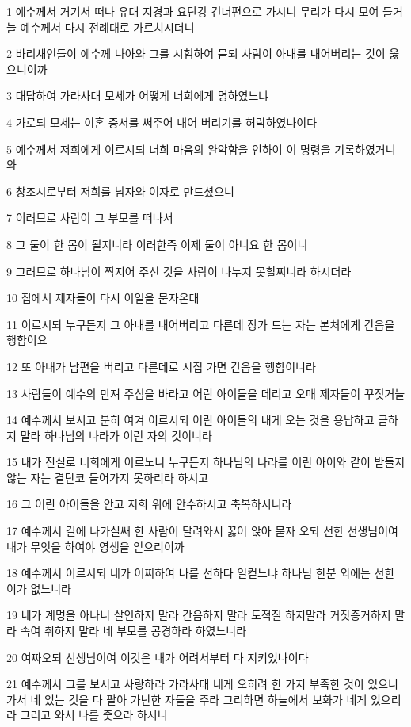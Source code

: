 \par 1 예수께서 거기서 떠나 유대 지경과 요단강 건너편으로 가시니 무리가 다시 모여 들거늘 예수께서 다시 전례대로 가르치시더니
\par 2 바리새인들이 예수께 나아와 그를 시험하여 묻되 사람이 아내를 내어버리는 것이 옳으니이까
\par 3 대답하여 가라사대 모세가 어떻게 너희에게 명하였느냐
\par 4 가로되 모세는 이혼 증서를 써주어 내어 버리기를 허락하였나이다
\par 5 예수께서 저희에게 이르시되 너희 마음의 완악함을 인하여 이 명령을 기록하였거니와
\par 6 창조시로부터 저희를 남자와 여자로 만드셨으니
\par 7 이러므로 사람이 그 부모를 떠나서
\par 8 그 둘이 한 몸이 될지니라 이러한즉 이제 둘이 아니요 한 몸이니
\par 9 그러므로 하나님이 짝지어 주신 것을 사람이 나누지 못할찌니라 하시더라
\par 10 집에서 제자들이 다시 이일을 묻자온대
\par 11 이르시되 누구든지 그 아내를 내어버리고 다른데 장가 드는 자는 본처에게 간음을 행함이요
\par 12 또 아내가 남편을 버리고 다른데로 시집 가면 간음을 행함이니라
\par 13 사람들이 예수의 만져 주심을 바라고 어린 아이들을 데리고 오매 제자들이 꾸짖거늘
\par 14 예수께서 보시고 분히 여겨 이르시되 어린 아이들의 내게 오는 것을 용납하고 금하지 말라 하나님의 나라가 이런 자의 것이니라
\par 15 내가 진실로 너희에게 이르노니 누구든지 하나님의 나라를 어린 아이와 같이 받들지 않는 자는 결단코 들어가지 못하리라 하시고
\par 16 그 어린 아이들을 안고 저희 위에 안수하시고 축복하시니라
\par 17 예수께서 길에 나가실쌔 한 사람이 달려와서 꿇어 앉아 묻자 오되 선한 선생님이여 내가 무엇을 하여야 영생을 얻으리이까
\par 18 예수께서 이르시되 네가 어찌하여 나를 선하다 일컫느냐 하나님 한분 외에는 선한 이가 없느니라
\par 19 네가 계명을 아나니 살인하지 말라 간음하지 말라 도적질 하지말라 거짓증거하지 말라 속여 취하지 말라 네 부모를 공경하라 하였느니라
\par 20 여짜오되 선생님이여 이것은 내가 어려서부터 다 지키었나이다
\par 21 예수께서 그를 보시고 사랑하라 가라사대 네게 오히려 한 가지 부족한 것이 있으니 가서 네 있는 것을 다 팔아 가난한 자들을 주라 그리하면 하늘에서 보화가 네게 있으리라 그리고 와서 나를 좇으라 하시니
